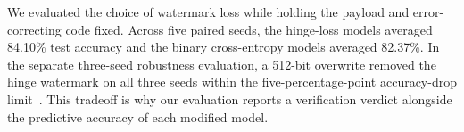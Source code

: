 We evaluated the choice of watermark loss while holding the payload and error-correcting code fixed. Across five paired seeds, the hinge-loss models averaged 84.10\% test accuracy and the binary cross-entropy models averaged 82.37\%. In the separate three-seed robustness evaluation, a 512-bit overwrite removed the hinge watermark on all three seeds within the five-percentage-point accuracy-drop limit~\cite{projectResults}. This tradeoff is why our evaluation reports a verification verdict alongside the predictive accuracy of each modified model.
